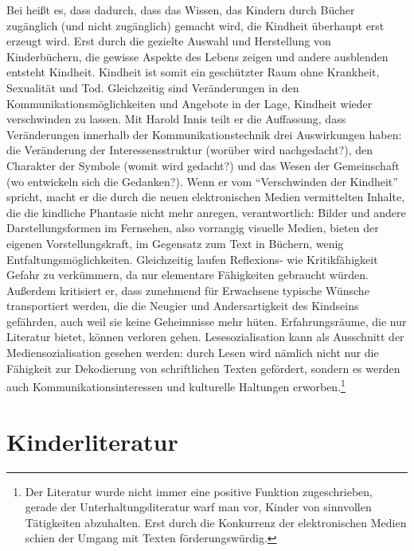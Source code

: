 Bei  heißt es, dass dadurch, dass das Wissen, das Kindern durch Bücher zugänglich (und nicht zugänglich) gemacht wird, die Kindheit überhaupt erst erzeugt wird. Erst durch die gezielte Auswahl und Herstellung von Kinderbüchern, die gewisse Aspekte des Lebens zeigen und andere ausblenden entsteht Kindheit. Kindheit ist somit ein geschützter Raum ohne Krankheit, Sexualität und Tod.
Gleichzeitig sind Veränderungen in den Kommunikationsmöglichkeiten und Angebote in  der Lage, Kindheit wieder verschwinden zu lassen. Mit Harold Innis teilt er die Auffassung,  dass Veränderungen innerhalb der Kommunikationstechnik drei Auswirkungen haben: die Veränderung der Interessensstruktur (worüber wird nachgedacht?), den Charakter der Symbole (womit wird gedacht?) und das Wesen der Gemeinschaft (wo entwickeln sich die Gedanken?). \parencite[34]{Postman1985} Wenn er vom \enquote{Verschwinden der Kindheit} spricht, macht er die durch die neuen elektronischen Medien vermittelten Inhalte, die die kindliche Phantasie nicht mehr anregen, verantwortlich: Bilder und andere Darstellungsformen im Fernsehen, also vorrangig visuelle Medien, bieten der eigenen Vorstellungskraft, im Gegensatz zum Text in Büchern, wenig Entfaltungsmöglichkeiten. Gleichzeitig laufen Reflexions- wie Kritikfähigkeit Gefahr zu verkümmern, da nur elementare Fähigkeiten gebraucht würden. Außerdem kritisiert er, dass zunehmend für Erwachsene typische Wünsche transportiert werden, die die Neugier und Andersartigkeit des Kindseins gefährden, auch weil sie keine Geheimnisse mehr hüten. \parencite[93\psq]{Postman1985} Erfahrungsräume, die nur Literatur bietet, können verloren gehen. Lesesozialisation kann als Ausschnitt der Mediensozialisation gesehen werden: durch Lesen wird nämlich nicht nur die Fähigkeit zur Dekodierung von schriftlichen Texten gefördert, sondern es werden auch Kommunikationsinteressen und kulturelle Haltungen erworben.\footnote{Der Literatur wurde nicht immer eine positive Funktion zugeschrieben, gerade der Unterhaltungsliteratur warf man vor, Kinder von sinnvollen Tätigkeiten abzuhalten. Erst durch die Konkurrenz der elektronischen Medien schien der Umgang mit Texten förderungswürdig. } \parencite[22\psqq]{Weinkauff2010}

\section{Kinderliteratur} 

